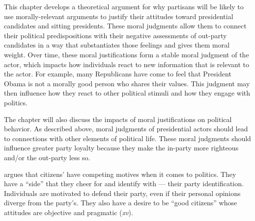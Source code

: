 This chapter develops a theoretical argument for why partisans will be likely to use morally-relevant arguments to justify their attitudes toward presidential candidates and sitting presidents. These moral judgments allow them to connect their political predispositions with their negative assessments of out-party candidates in a way that substantiates those feelings and gives them moral weight. Over time, these moral justifications form a stable moral judgment of the actor, which impacts how individuals react to new information that is relevant to the actor. For example, many Republicans have come to feel that President Obama is not a morally good person who shares their values. This judgment may then influence how they react to other political stimuli and how they engage with politics.

The chapter will also discuss the impacts of moral justifications on political behavior. As described above, moral judgments of presidential actors should lead to connections with other elements of political life. These moral judgments should influence greater party loyalty because they make the in-party more righteous and/or the out-party less so.

 argues that citizens' have competing motives when it comes to politics. They have a ``side'' that they cheer for and identify with --- their party identification. Individuals are motivated to defend their party, even if their personal opinions diverge from the party's. They also have a desire to be ``good citizens'' whose attitudes are objective and pragmatic (\emph{xv}).


%
%



